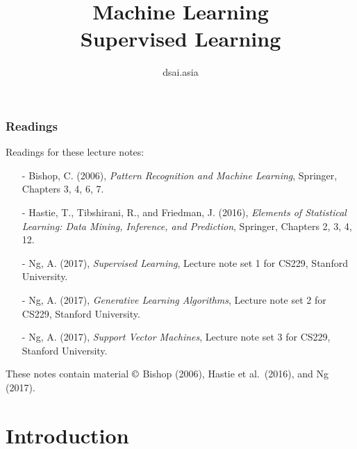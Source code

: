 \documentclass{beamer}
\title[Machine Learning]{Machine Learning\\Supervised Learning}
\author{dsai.asia}
\institute[]{Asian Data Science and Artificial Intelligence Master's Program}
\date{}
\begin{document}


\frame{\titlepage}

%

\begin{frame}
\frametitle{Readings}

Readings for these lecture notes:
\begin{itemize}
\item[-] Bishop, C. (2006), \textit{Pattern Recognition and Machine Learning},
  Springer, Chapters 3, 4, 6, 7.
\item[-] Hastie, T., Tibshirani, R., and Friedman, J. (2016),
  \textit{Elements of Statistical Learning: Data Mining, Inference, and
    Prediction}, Springer, Chapters 2, 3, 4, 12.
\item[-] Ng, A. (2017), \textit{Supervised Learning}, Lecture note set
  1 for CS229, Stanford University.
\item[-] Ng, A. (2017), \textit{Generative Learning Algorithms},
  Lecture note set 2 for CS229, Stanford University.
\item[-] Ng, A. (2017), \textit{Support Vector Machines},
  Lecture note set 3 for CS229, Stanford University.
\end{itemize}

These notes contain material $\copyright$ Bishop (2006), Hastie et
al.\ (2016), and Ng (2017).

\end{frame}

\section{Introduction}
\end{document}
